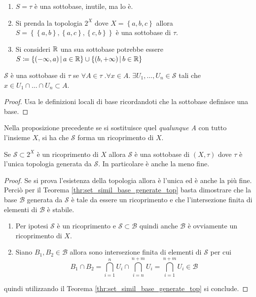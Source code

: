 \begin{example}
\begin{enumerate}
	\item $S = \tau$ è una sottobase, inutile, ma lo è.
	\item Si prenda la topologia $2^X$ dove $X = \left\{a,b,c\right\}$ allora $S = \left\{\left\{a,b\right\},\left\{a,c\right\},\left\{c,b\right\}\right\}$ è una sottobase di $\tau$.
	\item Si consideri $\mathbb{R}$ una sua sottobase potrebbe essere $S \coloneqq \left\{(-\infty, a) \,\middle|\, a \in \mathbb{R}\right\} \cup \left\{(b, +\infty) \,\middle|\, b \in \mathbb{R}\right\}$
\end{enumerate}
\end{example}

\begin{proposition}
	$\mathcal{S}$ è una sottobase di $\tau$ se $\forall A \in \tau \; . \forall x \in A . \; \exists U_1, \dots, U_n \in \mathcal{S}$ tali che $x \in U_1 \cap \dots \cap U_n \subset A$. 
\end{proposition}
\begin{proof}
	Usa le definizioni locali di base ricordandoti che la sottobase definisce una base.
\end{proof}

\begin{remark}
	Nella proposizione precedente se si sostituisce quel \textit{qualunque A} con tutto l'insieme $X$, si ha che $\mathcal{S}$ forma un ricoprimento di $X$.
\end{remark}

\begin{proposition}
	Se $\mathcal{S} \subset 2^X$ è un ricoprimento di $X$ allora $\mathcal{S}$ è una sottobase di $(X,\tau)$ dove $\tau$ è l'unica topologia generata da $\mathcal{S}$. In particolare è anche la meno fine.
\end{proposition}
\begin{proof}
	Se si prova l'esistenza della topologia allora è l'unica ed è anche la più fine.
	Perciò per il Teorema \ref{thr:set_simil_base_generate_top} basta dimostrare che la base $\mathcal{B}$ generata da $\mathcal{S}$ è tale da essere un ricoprimento e che l'intersezione finita di elementi di $\mathcal{B}$ è stabile.\\
	\begin{enumerate}
		\item Per ipotesi $\mathcal{S}$ è un ricoprimento e $\mathcal{S} \subset \mathcal{B}$ quindi anche $\mathcal{B}$ è ovviamente un ricoprimento di $X$.
		\item Siano $B_1, B_2 \in \mathcal{B}$ allora sono intersezione finita di elementi di $\mathcal{S}$ per cui
		\begin{equation*}
			B_1 \cap B_2 = \bigcap^n_{i=1} U_i \cap \bigcap^{n+m}_{i=n} U_i = \bigcap^{n+m}_{i=1} U_i  \in \mathcal{B}
		\end{equation*}
	\end{enumerate}
	quindi utilizzando il Teorema \ref{thr:set_simil_base_generate_top} si conclude.
	\end{proof}

